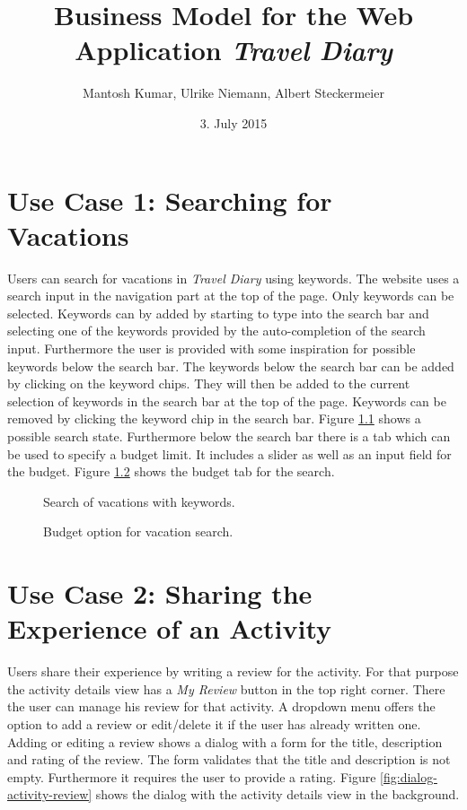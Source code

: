 \documentclass[IN,english]{tumbook}
\title{Business Model for the Web Application \emph{Travel Diary}}
\author{Mantosh Kumar, Ulrike Niemann, Albert Steckermeier}
\date{3. July 2015}
\begin{document}
\maketitle
\newpage
\tableofcontents
\newpage

\chapter{Use Case 1: Searching for Vacations}

Users can search for vacations in \emph{Travel Diary} using keywords. The website uses a search input in the navigation part at the top of the page. Only keywords can be selected. Keywords can by added by starting to type into the search bar and selecting one of the keywords provided by the auto-completion of the search input. Furthermore the user is provided with some inspiration for possible keywords below the search bar. The keywords below the search bar can be added by clicking on the keyword chips. They will then be added to the current selection of keywords in the search bar at the top of the page. Keywords can be removed by clicking the keyword chip in the search bar. Figure \ref{fig:search-keywords} shows a possible search state. Furthermore below the search bar there is a tab which can be used to specify a budget limit. It includes a slider as well as an input field for the budget. Figure \ref{fig:search-budget} shows the budget tab for the search.

\begin{figure}
	
	\caption{Search of vacations with keywords.}
	\label{fig:search-keywords}
\end{figure}

\begin{figure}
	
	\caption{Budget option for vacation search.}
	\label{fig:search-budget}
\end{figure}

\chapter{Use Case 2: Sharing the Experience of an Activity}

Users share their experience by writing a review for the activity. For that purpose the activity details view has a \emph{My Review} button in the top right corner. There the user can manage his review for that activity. A dropdown menu offers the option to add a review or edit/delete it if the user has already written one. Adding or editing a review shows a dialog with a form for the title, description and rating of the review. The form validates that the title and description is not empty. Furthermore it requires the user to provide a rating. Figure \ref{fig:dialog-activity-review} shows the dialog with the activity details view in the background.
\end{document}
